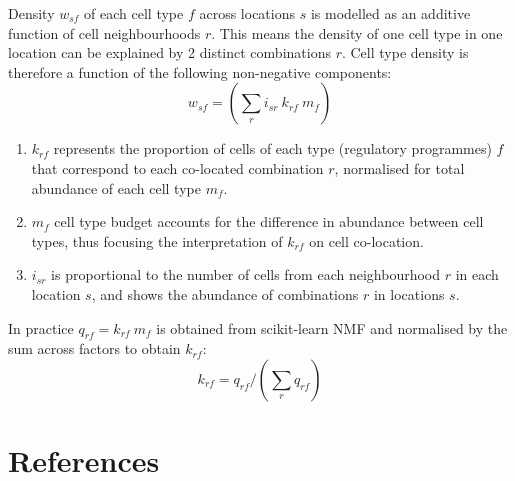 \documentclass[11pt,a4paper]{article}
\begin{document}
Density $w_{sf}$ of each cell type $f$ across locations $s$ is modelled as an additive function of cell neighbourhoods $r$. This means the density of one cell type in one location can be explained by 2 distinct combinations $r$. Cell type density is therefore a function of the following non-negative components:  
\begin{equation} \label{eq:circ:1}
w_{sf} = (\sum_{r} {i_{sr} \: k_{rf} \: m_{f}})
\end{equation}

\begin{enumerate}
    \item $k_{rf}$ represents the proportion of cells of each type (regulatory programmes) $f$ that correspond to each co-located combination $r$, normalised for total abundance of each cell type $m_{f}$.
    \item $m_{f}$ cell type budget accounts for the difference in abundance between cell types, thus focusing the interpretation of $k_{rf}$ on cell co-location.
    \item $i_{sr}$ is proportional to the number of cells from each neighbourhood $r$ in each location $s$, and shows the abundance of combinations $r$ in locations $s$.
\end{enumerate}

In practice $q_{rf} = k_{rf} \: m_{f}$ is obtained from scikit-learn NMF and normalised by the sum across factors to obtain $k_{rf}$:
\begin{equation} \label{eq:circ:2}
k_{rf} = q_{rf} / (\sum_{r} q_{rf})
\end{equation}

\section{References}

\printbibliography
\end{document}
